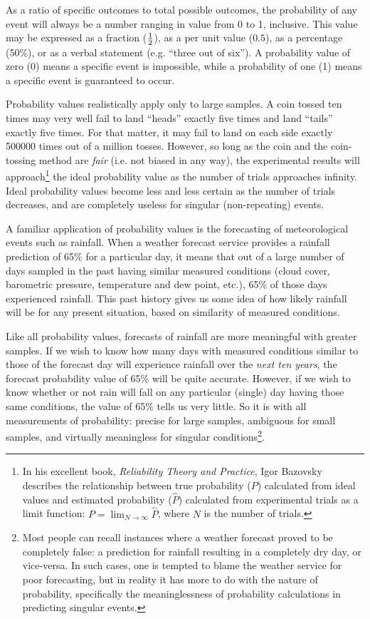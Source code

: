 As a ratio of specific outcomes to total possible outcomes, the probability of any event will always be a number ranging in value from 0 to 1, inclusive.  This value may be expressed as a fraction (${1 \over 2}$), as a per unit value ($0.5$), as a percentage (50\%), or as a verbal statement (e.g. ``three out of six'').  A probability value of zero (0) means a specific event is impossible, while a probability of one (1) means a specific event is guaranteed to occur.

Probability values realistically apply only to large samples.  A coin tossed ten times may very well fail to land ``heads'' exactly five times and land ``tails'' exactly five times.  For that matter, it may fail to land on each side exactly 500000 times out of a million tosses.  However, so long as the coin and the coin-tossing method are \textit{fair} (i.e. not biased in any way), the experimental results will approach\footnote{In his excellent book, \textit{Reliability Theory and Practice}, Igor Bazovsky describes the relationship between true probability ($P$) calculated from ideal values and estimated probability ($\hat P$) calculated from experimental trials as a limit function: $P = \lim_{N \to \infty} \hat P$, where $N$ is the number of trials.} the ideal probability value as the number of trials approaches infinity.  Ideal probability values become less and less certain as the number of trials decreases, and are completely useless for singular (non-repeating) events.  

A familiar application of probability values is the forecasting of meteorological events such as rainfall.  When a weather forecast service provides a rainfall prediction of 65\% for a particular day, it means that out of a large number of days sampled in the past having similar measured conditions (cloud cover, barometric pressure, temperature and dew point, etc.), 65\% of those days experienced rainfall.  This past history gives us some idea of how likely rainfall will be for any present situation, based on similarity of measured conditions.  

Like all probability values, forecasts of rainfall are more meaningful with greater samples.  If we wish to know how many days with measured conditions similar to those of the forecast day will experience rainfall over the \textit{next ten years}, the forecast probability value of 65\% will be quite accurate.  However, if we wish to know whether or not rain will fall on any particular (single) day having those same conditions, the value of 65\% tells us very little.  So it is with all measurements of probability: precise for large samples, ambiguous for small samples, and virtually meaningless for singular conditions\footnote{Most people can recall instances where a weather forecast proved to be completely false: a prediction for rainfall resulting in a completely dry day, or vice-versa.  In such cases, one is tempted to blame the weather service for poor forecasting, but in reality it has more to do with the nature of probability, specifically the meaninglessness of probability calculations in predicting singular events.}.

